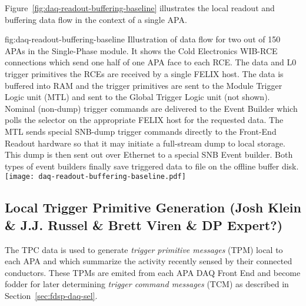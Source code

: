 
Figure~\ref{fig:daq-readout-buffering-baseline} illustrates the local
readout and buffering data flow in the context of a single APA.  

\begin{dunefigure}{fig:daq-readout-buffering-baseline}
  {Illustration of data flow for two out of 150 APAs in the
    Single-Phase module. 
    It shows the Cold Electronics WIB-RCE connections which send one
    half of one APA face to each RCE. 
    The data and L0 trigger primitives the RCEs are received by a
    single FELIX host. 
    The data is buffered into RAM and the trigger primitives are sent
    to the Module Trigger Logic unit (MTL) and sent to the Global
    Trigger Logic unit (not shown). 
    Nominal (non-dump) trigger commands are delivered to the Event
    Builder which polls the selector on the appropriate FELIX host for
    the requested data.
    The MTL sends special SNB-dump trigger commands directly to the
    Front-End Readout hardware so that it may initiate a full-stream
    dump to local storage. 
    This dump is then sent out over Ethernet to a special SNB Event
    builder. 
    Both types of event builders finally save triggered data to file
    on the offline buffer disk.}
\texttt{[image: daq-readout-buffering-baseline.pdf]}%
\end{dunefigure}


\subsection{Local Trigger Primitive Generation (Josh Klein \& J.J. Russel \& Brett Viren \& DP Expert?)}
\label{sec:fdsp-daq-ltp}


The TPC data is used to generate \textit{trigger primitive messages}
(TPM) local to each APA and which summarize the activity recently
sensed by their connected conductors.  These TPMs are emited from each
APA DAQ Front End and become fodder for later determining
\textit{trigger command messages} (TCM) as described in
Section~\ref{sec:fdsp-daq-sel}.

